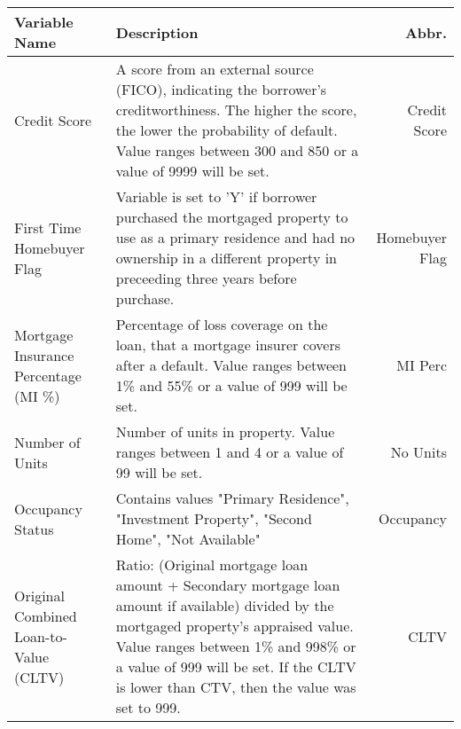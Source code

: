 \begin{longtable}{ Lp{8cm}R }\toprule
\textbf{Variable Name}                             & \textbf{Description}                                                                                                                                                                                                                                                                          & \textbf{Abbr.}       \\\midrule
Credit Score                              & A score from an external source (FICO), indicating the borrower's creditworthiness. The higher the score, the lower the probability of default. Value ranges between 300 and 850 or a value of 9999 will be set.                                                                     & Credit Score       \\\hline
First Time Homebuyer Flag                 & Variable is set to 'Y' if borrower purchased the mortgaged property to use as a primary residence and had no ownership in a different property in preceeding three years before purchase.                                                                                            & Homebuyer Flag     \\\hline
Mortgage Insurance Percentage (MI \%)     & Percentage of loss coverage on the loan, that a mortgage insurer covers after a default. Value ranges between 1\% and 55\% or a value of 999 will be set.                                                                                                                            & MI Perc            \\\hline
Number of Units                           & Number of units in property. Value ranges between 1 and 4 or a value of 99 will be set.                                                                                                                                                                                              & No Units           \\\hline
Occupancy Status                          & Contains values "Primary Residence", "Investment Property", "Second Home", "Not Available"                                                                                                                                                                                           & Occupancy          \\\hline
Original Combined Loan-to-Value (CLTV)    & Ratio: (Original mortgage loan amount + Secondary mortgage loan amount if available) divided by the mortgaged property’s appraised value. Value ranges between 1\% and 998\% or a value of 999 will be set. If the CLTV is lower than CTV, then the value was set to 999.            & CLTV               \\\hline

\end{longtable}
